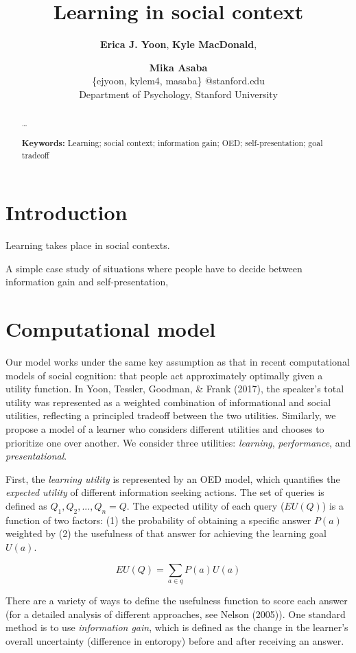 \documentclass[10pt, letterpaper]{article}
\title{Learning in social context}
\author{{\large \bf Erica J. Yoon}, {\large \bf Kyle MacDonald}, \and {\large \bf Mika Asaba} \\ \{ejyoon, kylem4, masaba\} @stanford.edu \\ Department of Psychology, Stanford University}
\begin{document}
\maketitle

\begin{abstract}
\ldots{}

\textbf{Keywords:}
Learning; social context; information gain; OED; self-presentation; goal
tradeoff
\end{abstract}

\section{Introduction}\label{introduction}

Learning takes place in social contexts.

A simple case study of situations where people have to decide between
information gain and self-presentation,

\section{Computational model}\label{computational-model}

Our model works under the same key assumption as that in recent
computational models of social cognition: that people act approximately
optimally given a utility function. In Yoon, Tessler, Goodman, \& Frank
(2017), the speaker's total utility was represented as a weighted
combination of informational and social utilities, reflecting a
principled tradeoff between the two utilities. Similarly, we propose a
model of a learner who considers different utilities and chooses to
prioritize one over another. We consider three utilities:
\emph{learning}, \emph{performance}, and \emph{presentational}.

First, the \emph{learning utility} is represented by an OED model, which
quantifies the \emph{expected utility} of different information seeking
actions. The set of queries is defined as \(Q_1, Q_2, ..., Q_n = {Q}\).
The expected utility of each query (\(EU(Q)\)) is a function of two
factors: (1) the probability of obtaining a specific answer \(P(a)\)
weighted by (2) the usefulness of that answer for achieving the learning
goal \(U(a)\).

\[EU(Q) = \sum_{a\in q}{P(a)U(a)}\]

There are a variety of ways to define the usefulness function to score
each answer (for a detailed analysis of different approaches, see Nelson
(2005)). One standard method is to use \emph{information gain}, which is
defined as the change in the learner's overall uncertainty (difference
in entoropy) before and after receiving an answer.
\end{document}

